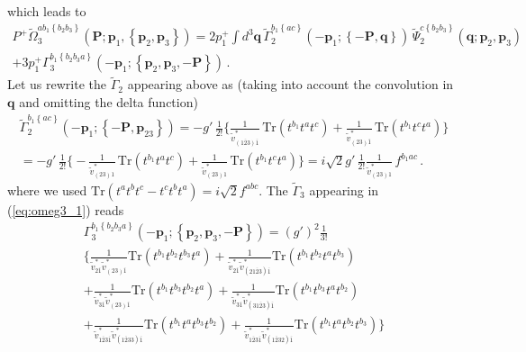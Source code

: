 \documentclass[english,american]{article}
\begin{document}
which leads to
\begin{multline}
P^{+}\tilde{\Omega}_{3}^{ab_{1}\left\{ b_{2}b_{3}\right\} }\left(\mathbf{P};\mathbf{p}_{1},\left\{ \mathbf{p}_{2},\mathbf{p}_{3}\right\} \right)=2p_{1}^{+}\int d^{3}\mathbf{q}\,\tilde{\Gamma}_{2}^{b_{1}\left\{ ac\right\} }\left(-\mathbf{p}_{1};\left\{ -\mathbf{P},\mathbf{q}\right\} \right)\,\tilde{\Psi}_{2}^{c\left\{ b_{2}b_{3}\right\} }\left(\mathbf{q};\mathbf{p}_{2},\mathbf{p}_{3}\right)\\
+3p_{1}^{+}\Gamma_{3}^{b_{1}\left\{ b_{2}b_{3}a\right\} }\left(-\mathbf{p}_{1};\left\{ \mathbf{p}_{2},\mathbf{p}_{3},-\mathbf{P}\right\} \right)\,.\label{eq:omeg3_1}
\end{multline}
Let us rewrite the $\tilde{\Gamma}_{2}$ appearing above as (taking
into account the convolution in $\mathbf{q}$ and omitting the delta
function)
\begin{multline}
\tilde{\Gamma}_{2}^{b_{1}\left\{ ac\right\} }\left(-\mathbf{p}_{1};\left\{ -\mathbf{P},\mathbf{p}_{23}\right\} \right)=-g'\,\frac{1}{2!}\Bigg\{\frac{1}{\tilde{v}_{\overline{\left(123\right)}\overline{1}}^{*}}\,\mathrm{Tr}\left(t^{b_{1}}t^{a}t^{c}\right)+\frac{1}{\tilde{v}_{\left(23\right)\overline{1}}^{*}}\,\mathrm{Tr}\left(t^{b_{1}}t^{c}t^{a}\right)\Bigg\}\\
=-g'\,\frac{1}{2!}\Bigg\{-\frac{1}{\tilde{v}_{\left(23\right)1}^{*}}\,\mathrm{Tr}\left(t^{b_{1}}t^{a}t^{c}\right)+\frac{1}{\tilde{v}_{\left(23\right)1}^{*}}\,\mathrm{Tr}\left(t^{b_{1}}t^{c}t^{a}\right)\Bigg\}=i\sqrt{2}g'\,\frac{1}{2!}\frac{1}{\tilde{v}_{\left(23\right)1}^{*}}\, f^{b_{1}ac}\,.
\end{multline}
where we used $\mathrm{Tr}\left(t^{a}t^{b}t^{c}-t^{c}t^{b}t^{a}\right)=i\sqrt{2}f^{abc}$.
The $\tilde{\Gamma}_{3}$ appearing in (\ref{eq:omeg3_1}) reads
\begin{multline*}
\Gamma_{3}^{b_{1}\left\{ b_{2}b_{3}a\right\} }\left(-\mathbf{p}_{1};\left\{ \mathbf{p}_{2},\mathbf{p}_{3},-\mathbf{P}\right\} \right)=\left(g'\right)^{2}\frac{1}{3!}\\
\Bigg\{\frac{1}{\tilde{v}_{2\overline{1}}^{*}\tilde{v}_{\left(23\right)\overline{1}}^{*}}\mathrm{Tr}\left(t^{b_{1}}t^{b_{2}}t^{b_{3}}t^{a}\right)+\frac{1}{\tilde{v}_{2\overline{1}}^{*}\tilde{v}_{\left(2\overline{123}\right)\overline{1}}^{*}}\mathrm{Tr}\left(t^{b_{1}}t^{b_{2}}t^{a}t^{b_{3}}\right)\\
+\frac{1}{\tilde{v}_{3\overline{1}}^{*}\tilde{v}_{\left(23\right)\overline{1}}^{*}}\mathrm{Tr}\left(t^{b_{1}}t^{b_{3}}t^{b_{2}}t^{a}\right)+\frac{1}{\tilde{v}_{3\overline{1}}^{*}\tilde{v}_{\left(3\overline{123}\right)\overline{1}}^{*}}\mathrm{Tr}\left(t^{b_{1}}t^{b_{3}}t^{a}t^{b_{2}}\right)\\
+\frac{1}{\tilde{v}_{\overline{123}\overline{1}}^{*}\tilde{v}_{\left(\overline{123}3\right)\overline{1}}^{*}}\mathrm{Tr}\left(t^{b_{1}}t^{a}t^{b_{3}}t^{b_{2}}\right)+\frac{1}{\tilde{v}_{\overline{123}\overline{1}}^{*}\tilde{v}_{\left(\overline{123}2\right)\overline{1}}^{*}}\mathrm{Tr}\left(t^{b_{1}}t^{a}t^{b_{2}}t^{b_{3}}\right)\Bigg\}
\end{multline*}
\end{document}
